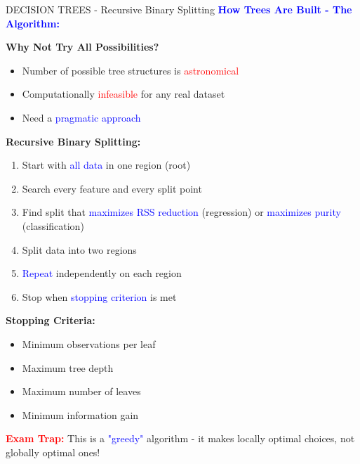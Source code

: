 \documentclass[8pt]{beamer}
\begin{document}
	\begin{frame}{DECISION TREES - Recursive Binary Splitting}
		\fontsize{6.5}{7.5}\selectfont
		\textcolor{blue}{\textbf{How Trees Are Built - The Algorithm:}}
		
		\textbf{Why Not Try All Possibilities?}
		\begin{itemize}
			\item Number of possible tree structures is \textcolor{red}{astronomical}
			\item Computationally \textcolor{red}{infeasible} for any real dataset
			\item Need a \textcolor{blue}{pragmatic approach}
		\end{itemize}
		
		\textbf{Recursive Binary Splitting:}
		\begin{enumerate}
			\item Start with \textcolor{blue}{all data} in one region (root)
			\item Search every feature and every split point
			\item Find split that \textcolor{blue}{maximizes RSS reduction} (regression) or \textcolor{blue}{maximizes purity} (classification)
			\item Split data into two regions
			\item \textcolor{blue}{Repeat} independently on each region
			\item Stop when \textcolor{blue}{stopping criterion} is met
		\end{enumerate}
		
		\textbf{Stopping Criteria:}
		\begin{itemize}
			\item Minimum observations per leaf
			\item Maximum tree depth
			\item Maximum number of leaves
			\item Minimum information gain
		\end{itemize}
		
		\textcolor{red}{\textbf{Exam Trap:}} This is a \textcolor{blue}{"greedy"} algorithm - it makes locally optimal choices, not globally optimal ones!
	\end{frame}
	
\end{document}
